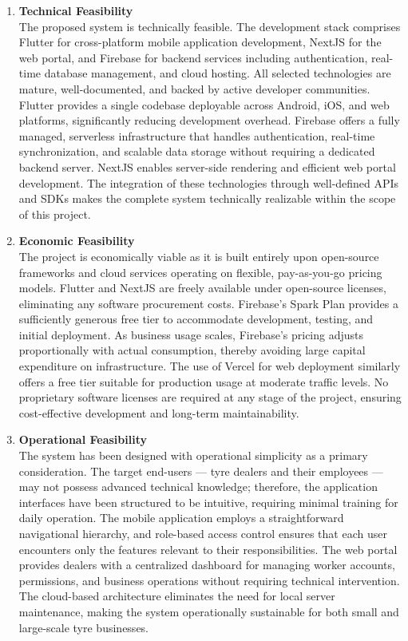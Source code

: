 \documentclass[12pt, oneside]{article}
\begin{document}
\begin{enumerate}

    \item \textbf{Technical Feasibility}\\[0.25cm]
    The proposed system is technically feasible. The development stack comprises Flutter for cross-platform mobile application development, NextJS for the web portal, and Firebase for backend services including authentication, real-time database management, and cloud hosting. All selected technologies are mature, well-documented, and backed by active developer communities. Flutter provides a single codebase deployable across Android, iOS, and web platforms, significantly reducing development overhead. Firebase offers a fully managed, serverless infrastructure that handles authentication, real-time synchronization, and scalable data storage without requiring a dedicated backend server. NextJS enables server-side rendering and efficient web portal development. The integration of these technologies through well-defined APIs and SDKs makes the complete system technically realizable within the scope of this project.

    \item \textbf{Economic Feasibility}\\[0.25cm]
    The project is economically viable as it is built entirely upon open-source frameworks and cloud services operating on flexible, pay-as-you-go pricing models. Flutter and NextJS are freely available under open-source licenses, eliminating any software procurement costs. Firebase's Spark Plan provides a sufficiently generous free tier to accommodate development, testing, and initial deployment. As business usage scales, Firebase's pricing adjusts proportionally with actual consumption, thereby avoiding large capital expenditure on infrastructure. The use of Vercel for web deployment similarly offers a free tier suitable for production usage at moderate traffic levels. No proprietary software licenses are required at any stage of the project, ensuring cost-effective development and long-term maintainability.

    \item \textbf{Operational Feasibility}\\[0.25cm]
    The system has been designed with operational simplicity as a primary consideration. The target end-users — tyre dealers and their employees — may not possess advanced technical knowledge; therefore, the application interfaces have been structured to be intuitive, requiring minimal training for daily operation. The mobile application employs a straightforward navigational hierarchy, and role-based access control ensures that each user encounters only the features relevant to their responsibilities. The web portal provides dealers with a centralized dashboard for managing worker accounts, permissions, and business operations without requiring technical intervention. The cloud-based architecture eliminates the need for local server maintenance, making the system operationally sustainable for both small and large-scale tyre businesses.


\end{enumerate}
\end{document}
